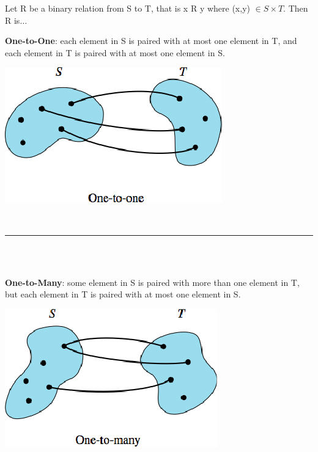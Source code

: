 \documentclass[12pt, letterpaper]{article}
\newcommand{\horizline}[0]{\noindent\rule{\textwidth}{1pt}\\}
\begin{document}
Let R be a binary relation from S to T, that is x R y where (x,y) $\in S \times T$. Then R is$\dots$ \\ \smallbreak
\begin{minipage}[t]{0.7\linewidth}
	\textbf{One-to-One}: each element in S is paired with at most one element in T, and each element in T is paired with at most one element in S.
\end{minipage}
\begin{minipage}[t]{0.25\linewidth}
    \centering
    \strut\vspace*{-\baselineskip}\newline\includegraphics[width=\linewidth]{relations/onetoone.png} \smallbreak
\end{minipage}\\
\horizline \\
\begin{minipage}[t]{0.7\linewidth}
	\textbf{One-to-Many}: some element in S is paired with more than one element in T, but each element in T is paired with at most one element in S.
\end{minipage}
\begin{minipage}[t]{0.25\linewidth}
    \centering
    \strut\vspace*{-\baselineskip}\newline\includegraphics[width=\linewidth]{relations/onetomany.png} \smallbreak
\end{minipage}\\
\end{document}
